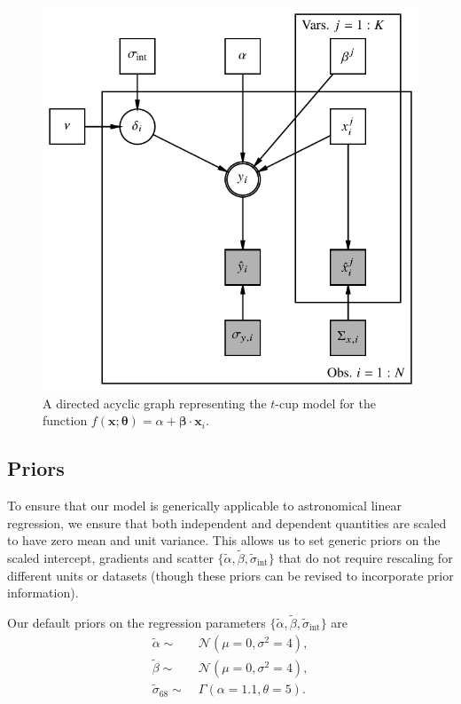 \documentclass[fleqn,usenatbib]{rasti}
\newcommand{\intercept}{\alpha}
\newcommand{\covariate}{\beta}
\begin{document}
\begin{figure}
	\includegraphics[width=\columnwidth]{graphics/dag.pdf}
    \caption{A directed acyclic graph representing the $t$-cup model for the
    function $f(\boldsymbol{x}; \boldsymbol{\theta}) = \alpha +
    \boldsymbol{\beta} \cdot \boldsymbol{x}_i$.}
    \label{fig:formalism.dag}
\end{figure}

\subsection{Priors}
\label{sec:formalism.prior}

To ensure that our model is generically applicable to astronomical linear
regression, we ensure that both independent and dependent quantities are scaled
to have zero mean and unit variance. This allows us to set generic priors on the
scaled intercept, gradients and scatter $\{\tilde{\intercept},
\tilde{\covariate}, \tilde{\sigma}_{\text{int}}\}$ that do not require rescaling
for different units or datasets (though these priors can be revised to
incorporate prior information).

Our default priors on the regression parameters $\{\tilde{\intercept},
\tilde{\covariate}, \tilde{\sigma}_{\text{int}}\}$ are
\begin{align}
    \tilde{\intercept} \sim&\; \mathcal N(\mu = 0, \sigma^2 = 4), \\
    \tilde{\covariate} \sim&\; \mathcal N(\mu = 0, \sigma^2 = 4), \\
    \tilde{\sigma}_{68} \sim&\; \Gamma(\alpha = 1.1, \theta = 5).
\end{align}
\end{document}

